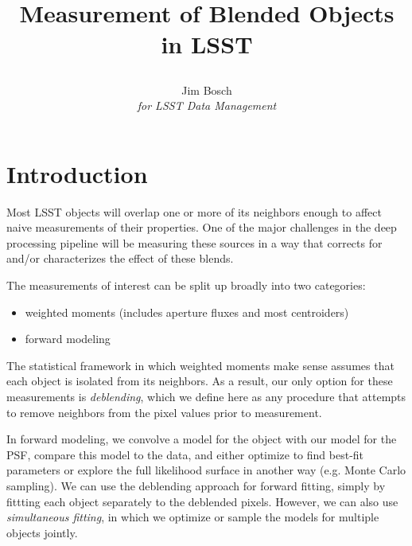 \documentclass[10pt]{article}
\title{Measurement of Blended Objects in LSST\\
{\author{
    Jim Bosch\\
    {\em for LSST Data Management}
}}}
\begin{document}
\maketitle

\section{Introduction}

Most LSST objects will overlap one or more of its neighbors enough to affect
naive measurements of their properties.  One of the major challenges in the
deep processing pipeline will be measuring these sources in a way that
corrects for and/or characterizes the effect of these blends.

The measurements of interest can be split up broadly into two categories:
\begin{itemize}
    \item weighted moments (includes aperture fluxes and most centroiders)
    \item forward modeling
\end{itemize}

The statistical framework in which weighted moments make sense assumes that
each object is isolated from its neighbors.  As a result, our only option for
these measurements is {\em deblending}, which we define here as any
procedure that attempts to remove neighbors from the pixel values prior to
measurement.

In forward modeling, we convolve a model for the object with our model for
the PSF, compare this model to the data, and either optimize to find
best-fit parameters or explore the full likelihood surface in another way
(e.g. Monte Carlo sampling).  We can use the deblending approach for
forward fitting, simply by fittting each object separately to the deblended
pixels.  However, we can also use {\em simultaneous fitting}, in which we
optimize or sample the models for multiple objects jointly.
\end{document}
